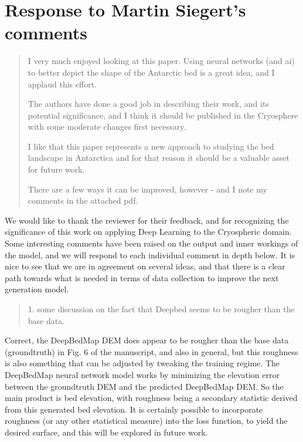 \documentclass{article}
\begin{document}

\section*{Response to Martin Siegert's comments}



\begin{quote}
\color{blue}
  I very much enjoyed looking at this paper.
  Using neural networks (and ai) to better depict the shape of the Antarctic bed is a great idea, and I applaud this effort.

  The authors have done a good job in describing their work, and its potential significance, and I think it should be published in the Cryosphere with some moderate changes first necessary.

  I like that this paper represents a new approach to studying the bed landscape in Antarctica and for that reason it should be a valuable asset for future work.

  There are a few ways it can be improved, however - and I note my comments in the attached pdf.
\end{quote}

We would like to thank the reviewer for their feedback, and for recognizing the significance of this work on applying Deep Learning to the Cryospheric domain.
Some interesting comments have been raised on the output and inner workings of the model, and we will respond to each individual comment in depth below.
It is nice to see that we are in agreement on several ideas, and that there is a clear path towards what is needed in terms of data collection to improve the next generation model.

\bigskip
{}

\begin{quote}
\color{blue}
  1. some discussion on the fact that Deepbed seems to be rougher than the base data.
\end{quote}

Correct, the DeepBedMap DEM does appear to be rougher than the base data (groundtruth) in Fig. 6 of the manuscript, and also in general, but this roughness is also something that can be adjusted by tweaking the training regime.
The DeepBedMap neural network model works by minimizing the elevation error between the groundtruth DEM and the predicted DeepBedMap DEM.
So the main product is bed elevation, with roughness being a secondary statistic derived from this generated bed elevation.
It is certainly possible to incorporate roughness (or any other statistical measure) into the loss function, to yield the desired surface, and this will be explored in future work.
\end{document}
